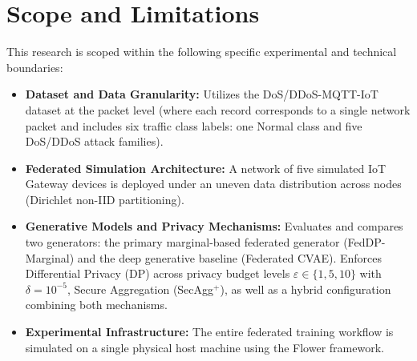 \clearpage
\section{Scope and Limitations}
This research is scoped within the following specific experimental and technical boundaries:
\begin{itemize}
    \item \textbf{Dataset and Data Granularity:} Utilizes the DoS/DDoS-MQTT-IoT dataset at the packet level (where each record corresponds to a single network packet and includes six traffic class labels: one Normal class and five DoS/DDoS attack families).
    \item \textbf{Federated Simulation Architecture:} A network of five simulated IoT Gateway devices is deployed under an uneven data distribution across nodes (Dirichlet non-IID partitioning).
    \item \textbf{Generative Models and Privacy Mechanisms:} Evaluates and compares two generators: the primary marginal-based federated generator (FedDP-Marginal) and the deep generative baseline (Federated CVAE). Enforces Differential Privacy (DP) across privacy budget levels $\varepsilon \in \{1, 5, 10\}$ with $\delta = 10^{-5}$, Secure Aggregation (SecAgg$^+$), as well as a hybrid configuration combining both mechanisms.
    \item \textbf{Experimental Infrastructure:} The entire federated training workflow is simulated on a single physical host machine using the Flower framework.
\end{itemize}

